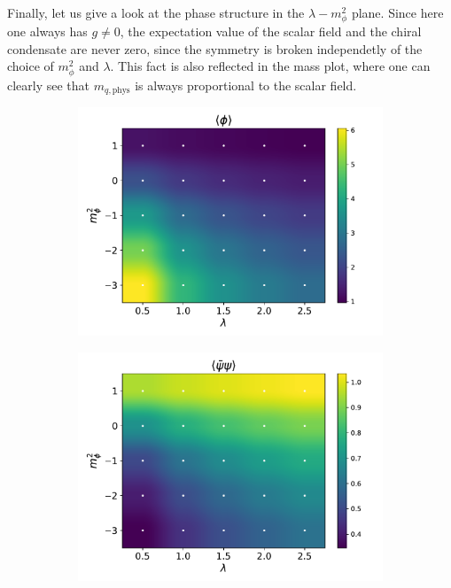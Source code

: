 Finally, let us give a look at the phase structure in the $\lambda - m_\phi^2$ plane. 
Since here one always has $g \neq 0$, the expectation value of the scalar field and the chiral condensate are never zero, since the symmetry is broken independetly of the choice of $m_\phi^2$ and $\lambda$. This fact is also reflected in the mass plot,
where one can clearly see that $m_{q,\text{phys}}$ is always proportional to the scalar field.
\begin{figure}[hbp]
    \centering
    \begin{subfigure}[b]{0.47\textwidth}
        \includegraphics[width=\textwidth]{figures/phase_diagram/m-lam/phase_diagram_phi.pdf}
    \end{subfigure}
    \begin{subfigure}[b]{0.47\textwidth}
        \includegraphics[width=\textwidth]{figures/phase_diagram/m-lam/phase_diagram_cond.pdf}

\end{subfigure}
\end{figure}
